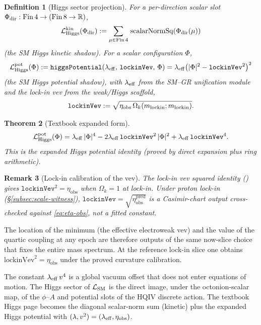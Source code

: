 \documentclass[11pt]{amsart}
\newcommand{\leanid}[1]{{\footnotesize\path{#1}}}
\newtheorem{theorem}{Theorem}[section]
\newtheorem{definition}[theorem]{Definition}
\newtheorem{remark}[theorem]{Remark}
\begin{document}
\begin{definition}[Higgs sector projection]
For a per-direction scalar slot $\Phi_{\rm dir}:\mathrm{Fin}\,4\to(\mathrm{Fin}\,8\to\mathbb{R})$,
\[
\mathcal{L}_{\rm Higgs}^{\rm kin}(\Phi_{\rm dir})
:= \sum_{\mu\in\mathrm{Fin}\,4}\,\mathrm{scalarNormSq}(\Phi_{\rm dir}(\mu))
\]
(the SM Higgs kinetic shadow). For a scalar configuration $\Phi$,
\[
\mathcal{L}_{\rm Higgs}^{\rm pot}(\Phi)
:= \texttt{higgsPotential}(\lambda_{\rm eff},\,\texttt{lockinVev},\,\Phi)
= \lambda_{\rm eff}\bigl(|\Phi|^2 - \texttt{lockinVev}^2\bigr)^2
\]
(the SM Higgs potential shadow), with $\lambda_{\rm eff}$ from the SM–GR unification module and the lock-in vev from the weak/Higgs scaffold,
\[
\texttt{lockinVev}
:= \sqrt{\eta_{\mathrm{obs}}\,\Omega_k(m_{\rm lockin};m_{\rm lockin})}.
\]
\end{definition}

\begin{theorem}[Textbook expanded form]
\[
\mathcal{L}_{\rm Higgs}^{\rm pot}(\Phi)
= \lambda_{\rm eff}\,|\Phi|^4
- 2\lambda_{\rm eff}\,\texttt{lockinVev}^2\,|\Phi|^2
+ \lambda_{\rm eff}\,\texttt{lockinVev}^4 .
\]
This is the expanded Higgs potential identity (proved by direct expansion plus ring arithmetic).
\end{theorem}

\begin{remark}[Lock-in calibration of the vev]
The lock-in vev squared identity (\leanid{lockinVev_sq_eq_eta_paper}) gives $\texttt{lockinVev}^2=\eta_{\mathrm{obs}}$ when $\Omega_k=1$ at lock-in.
Under proton lock-in (\S\ref{subsec:scale-witness}), $\texttt{lockinVev}=\sqrt{\eta_{\mathrm{obs}}^{\mathrm{pred}}}$ is a Casimir-chart output cross-checked against \eqref{eq:eta-obs}, not a fitted constant.
\end{remark}

The location of the minimum (the effective electroweak vev) and the value of the quartic coupling at any epoch are therefore outputs of the same now-slice choice that fixes the entire mass spectrum. At the reference lock-in slice one obtains $\text{lockinVev}^2 = \eta_{\mathrm{obs}}$ under the proved curvature calibration.

The constant $\lambda_{\rm eff}\,v^4$ is a global vacuum offset that does not enter equations of motion. The Higgs sector of $\mathcal{L}_{\rm SM}$ is the direct image, under the octonion-scalar map, of the $\phi$–$A$ and potential slots of the HQIV discrete action. The textbook Higgs page becomes the diagonal scalar-norm sum (kinetic) plus the expanded Higgs potential with $(\lambda,v^2)=(\lambda_{\rm eff},\eta_{\mathrm{obs}})$.
\end{document}
